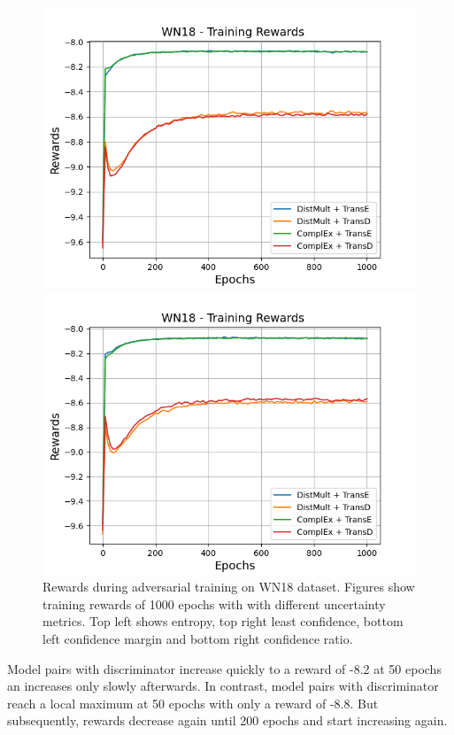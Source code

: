 \begin{figure}[H]
\begin{minipage}{.5\textwidth}
      \centering
      \includegraphics[width=0.9\linewidth]{figures/results/gan_train/not_pretrained/uncertainty/max_distribution/confidence_margin/wn18/uncertainty_wn18_rew.png}
    \end{minipage}%
    \begin{minipage}{.5\textwidth}
      \centering
      \includegraphics[width=0.9\linewidth]{figures/results/gan_train/not_pretrained/uncertainty/max_distribution/confidence_ratio/wn18/uncertainty_wn18_rew.png}
    \end{minipage}%
    \caption{Rewards during adversarial training on \textsc{WN18} dataset. 
    Figures show training rewards of 1000 epochs with \ussoftmax with different uncertainty metrics.
    Top left shows entropy, top right least confidence, 
    bottom left confidence margin and bottom right confidence ratio.}
    \label{fig:advtrain_metrics_wn18}
\end{figure}
Model pairs with \transe discriminator increase quickly to a reward of -8.2 at 50 epochs an increases only slowly afterwards.
In contrast, model pairs with \transd discriminator reach a local maximum at 50 epochs with only a reward of -8.8.
But subsequently, rewards decrease again until 200 epochs and start increasing again.
